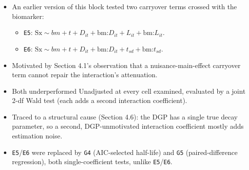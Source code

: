 \documentclass[
  11pt,
]{article}
\providecommand{\tightlist}{%
  \setlength{\itemsep}{0pt}\setlength{\parskip}{0pt}}
\begin{document}
\begin{itemize}
\tightlist
\item
  An earlier version of this block tested two carryover terms crossed
  with the biomarker:

  \begin{itemize}
  \tightlist
  \item
    \texttt{E5}: \(\text{Sx} \sim bm + t + D_{it} + \text{bm:}D_{it} +
    L_{it} + \text{bm:}L_{it}\).
  \item
    \texttt{E6}: \(\text{Sx} \sim bm + t + D_{it} + \text{bm:}D_{it} +
    t_{sd} + \text{bm:}t_{sd}\).
  \end{itemize}
\item
  Motivated by Section 4.1's observation that a nuisance-main-effect
  carryover term cannot repair the interaction's attenuation.
\item
  Both underperformed Unadjusted at every cell examined, evaluated by
  a joint 2-df Wald test (each adds a second interaction
  coefficient).
\item
  Traced to a structural cause (Section 4.6): the DGP has a single
  true decay parameter, so a second, DGP-unmotivated interaction
  coefficient mostly adds estimation noise.
\item
  \texttt{E5}/\texttt{E6} were replaced by \texttt{G4} (AIC-selected half-life) and \texttt{G5}
  (paired-difference regression), both single-coefficient tests,
  unlike \texttt{E5}/\texttt{E6}.
\end{itemize}

\begin{table}
\centering
\caption{\label{tab:tab-s7}Block S7: all five G1-G5 specifications at the
    reference cell (Hybrid, $N = 70$, $c_{bm} = 0.45$,
    $t_{1/2} = 1.0$, exponential DGP, $n_{sim} = 500$, all
    replicates converged). G4 targets bm:Dbc at the AIC-selected
    half-life (candidate grid 0.25, 0.5, 1.0, 2.0); G5 targets the
    slope of the patient-level diff~bm regression. Neither is the
    same estimand as bm:Db (G1/G2), so only power is comparable
    across rows. Mean selected t1/2 is the average AIC-chosen
    half-life for G4 across replicates, against a true half-life of
    1.0.}
\centering
{}
\end{table}
\end{document}
